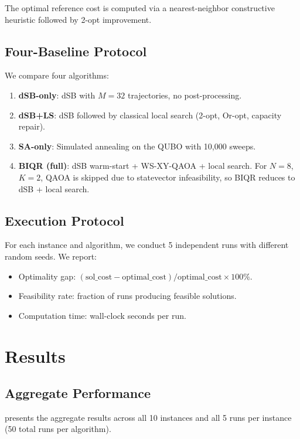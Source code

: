 \documentclass[11pt,a4paper]{article}
\theoremstyle{definition}
\begin{document}
The optimal reference cost is computed via a nearest-neighbor constructive heuristic followed by 2-opt improvement.

\subsection{Four-Baseline Protocol}

We compare four algorithms:

\begin{enumerate}
    \item \textbf{dSB-only}: dSB with $M=32$ trajectories, no post-processing.
    \item \textbf{dSB+LS}: dSB followed by classical local search (2-opt, Or-opt, capacity repair).
    \item \textbf{SA-only}: Simulated annealing on the QUBO with 10,000 sweeps.
    \item \textbf{BIQR (full)}: dSB warm-start + WS-XY-QAOA + local search. For $N=8$, $K=2$, QAOA is skipped due to statevector infeasibility, so BIQR reduces to dSB + local search.
\end{enumerate}

\subsection{Execution Protocol}

For each instance and algorithm, we conduct \num{5} independent runs with different random seeds. We report:
\begin{itemize}
    \item Optimality gap: $(\text{sol\_cost} - \text{optimal\_cost}) / \text{optimal\_cost} \times 100\%$.
    \item Feasibility rate: fraction of runs producing feasible solutions.
    \item Computation time: wall-clock seconds per run.
\end{itemize}

\section{Results}\label{sec:results}

\subsection{Aggregate Performance}

 presents the aggregate results across all \num{10} instances and all \num{5} runs per instance (\num{50} total runs per algorithm).
\end{document}
